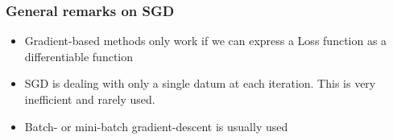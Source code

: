 \subsubsection{General remarks on SGD}
\begin{itemize}
    \item Gradient-based methods only work if we can express a Loss function as a differentiable function
    \item SGD is dealing with only a single datum at each iteration. This is very inefficient and rarely used.
    \item Batch- or mini-batch gradient-descent is usually used
\end{itemize}